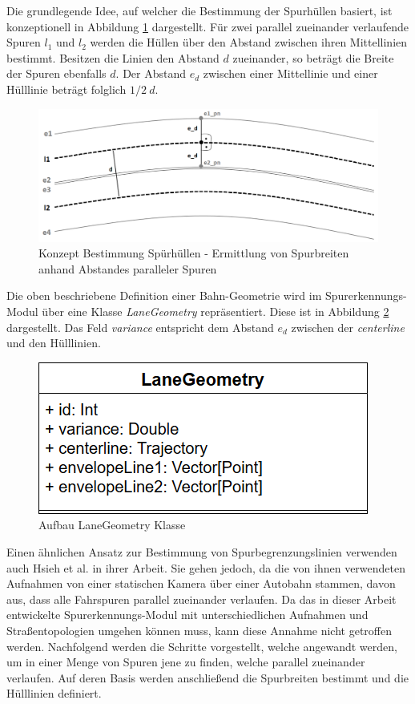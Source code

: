 Die grundlegende Idee, auf welcher die Bestimmung der Spurhüllen basiert, ist konzeptionell in Abbildung
\ref{fig:real2_envelope_definition_concept} dargestellt.
Für zwei parallel zueinander verlaufende Spuren $l_1$ und $l_2$ werden die Hüllen über den Abstand zwischen
ihren Mittellinien bestimmt. Besitzen die Linien den Abstand $d$ zueinander, so beträgt die Breite
der Spuren ebenfalls $d$. Der Abstand $e_d$ zwischen einer Mittellinie und einer Hülllinie beträgt folglich
$1/2\ d$.

\begin{figure}[H]
    \centering
    \includegraphics[width=0.75\linewidth]{resources/img/umsetzung/U2/concept_lane_envelope}
    \caption[Konzept Bestimmung Spürhüllen]
            {Konzept Bestimmung Spürhüllen - Ermittlung von Spurbreiten anhand Abstandes paralleler Spuren}
    \label{fig:real2_envelope_definition_concept}
\end{figure}

Die oben beschriebene Definition einer Bahn-Geometrie wird im Spurerkennungs-Modul über eine Klasse
\textit{LaneGeometry} repräsentiert. Diese ist in Abbildung \ref{fig:real2_laneGeometry_ClassDia} dargestellt.
Das Feld \textit{variance} entspricht dem Abstand $e_d$ zwischen der \textit{centerline} und den Hülllinien.

\begin{figure}[H]
    \centering
    \includegraphics[width=0.38\linewidth]{resources/img/umsetzung/U2/LaneGeometry_ClassDia}
    \caption{Aufbau LaneGeometry Klasse}
    \label{fig:real2_laneGeometry_ClassDia}
\end{figure}

Einen ähnlichen Ansatz zur Bestimmung von Spurbegrenzungslinien verwenden auch Hsieh et al. in ihrer Arbeit.
Sie gehen jedoch, da die von ihnen verwendeten
Aufnahmen von einer statischen Kamera über einer Autobahn stammen, davon aus, dass alle Fahrspuren parallel
zueinander verlaufen. Da das in dieser Arbeit entwickelte Spurerkennungs-Modul mit unterschiedlichen
Aufnahmen und Straßentopologien umgehen können muss, kann diese Annahme nicht getroffen werden.
Nachfolgend werden die Schritte vorgestellt, welche angewandt werden, um in einer Menge von Spuren
jene zu finden, welche parallel zueinander verlaufen. Auf deren Basis werden anschließend die Spurbreiten bestimmt und
die Hülllinien definiert.

